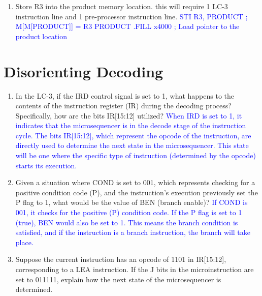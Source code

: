\documentclass{article}
\begin{document}
\begin{enumerate}[label=(\alph*)]
\begin{enumerate}[label=(\alph*), itemsep = 50pt]
{        ADD R2, R2, #-1 ; R2 = R2 - 1 \newline
        BRp LOOP ; PC = LOOP | Loops to make next interactive add
        }
        \item Store R3 into the product memory location. this will require 1 LC-3 instruction line and 1 pre-processor instruction line.
        \newline \newline \textcolor{blue} {
        STI R3, PRODUCT ; M[M[PRODUCT]] = R3 \newline
        PRODUCT .FILL x4000 ; Load pointer to the product location
        }
    \end{enumerate}
    \newpage
    
    \section{Disorienting Decoding}
    \begin{enumerate}[label=(\alph*), itemsep = 50pt]
        \item In the LC-3, if the IRD control signal is set to 1, what happens to the contents of the instruction register (IR) during the decoding process? Specifically, how are the bits IR[15:12] utilized?
        \newline \newline \textcolor{blue} {When IRD is set to 1, it indicates that the microsequencer is in the decode stage of the instruction cycle. The bits IR[15:12], which represent the opcode of the instruction, are directly used to determine the next state in the microsequencer. This state will be one where the specific type of instruction (determined by the opcode) starts its execution.}
        \item Given a situation where COND is set to 001, which represents checking for a positive condition code (P), and the instruction’s execution previously set the P flag to 1, what would be the value of BEN (branch enable)?
        \newline \newline \textcolor{blue} {If COND is 001, it checks for the positive (P) condition code. If the P flag is set to 1 (true), BEN would also be set to 1. This means the branch condition is satisfied, and if the instruction is a branch instruction, the branch will take place.}
        \item Suppose the current instruction has an opcode of 1101 in IR[15:12], corresponding to a LEA instruction. If the J bits in the microinstruction are set to 011111, explain how the next state of the microsequencer is determined.

\end{enumerate}
\end{enumerate}
\end{document}
